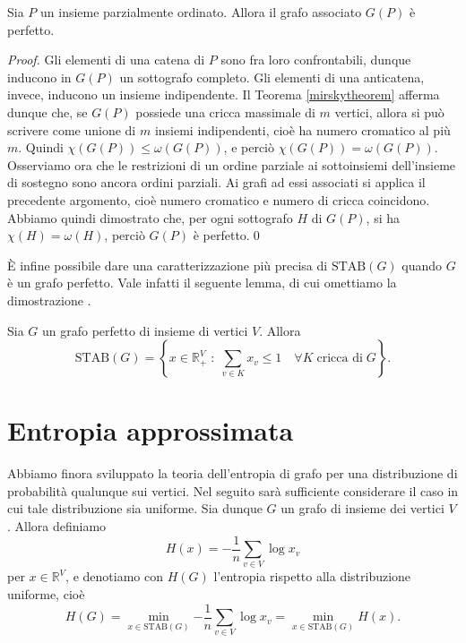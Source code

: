 \begin{corollary}
  Sia \(P\) un insieme parzialmente ordinato. Allora il grafo associato \(G(P)\) è perfetto.
\end{corollary}
\begin{proof}
  Gli elementi di una catena di \(P\) sono fra loro confrontabili, dunque inducono in \(G(P)\) un sottografo completo. Gli elementi di una anticatena, invece, inducono un insieme indipendente. Il Teorema \ref{mirskytheorem} afferma dunque che, se \(G(P)\) possiede una cricca massimale di \(m\) vertici, allora si pu\`o scrivere come unione di \(m\) insiemi indipendenti, cio\`e ha numero cromatico al più \(m\). Quindi \(\chi(G(P))\le \omega(G(P))\), e perciò \(\chi(G(P))=\omega(G(P))\). Osserviamo ora che le restrizioni di un ordine parziale ai sottoinsiemi dell'insieme di sostegno sono ancora ordini parziali. Ai grafi ad essi associati si applica il precedente argomento, cioè numero cromatico e numero di cricca coincidono. Abbiamo quindi dimostrato che, per ogni sottografo \(H\) di \(G(P)\), si ha \(\chi(H)=\omega(H)\), perciò \(G(P)\) è perfetto.\qed
\end{proof}

È infine possibile dare una caratterizzazione più precisa di \(\text{STAB}(G)\) quando \(G\) è un grafo perfetto. Vale infatti il seguente lemma, di cui omettiamo la dimostrazione \cite{Chvatal1975}.

\begin{lemma}
	[Chvatál] \label{chvatallemma} Sia \(G\) un grafo perfetto di insieme di vertici \(V\). Allora
	\[
	  \text{STAB}(G) = \left\{x\in \mathbb{R}_{+}^V\;:\;\sum_{v\in K}{x_v}\le 1\quad \forall K\;\text{cricca di}\;G\right\}\text{.}
	\]
\end{lemma}

\section{Entropia approssimata}

Abbiamo finora sviluppato la teoria dell'entropia di grafo per una distribuzione di probabilità qualunque sui vertici. Nel seguito sarà sufficiente considerare il caso in cui tale distribuzione sia uniforme. Sia dunque \(G\) un grafo di insieme dei vertici \(V\). Allora definiamo
\[
  H(x) = -\frac{1}{n}\sum_{v\in V}{\log{x_v}}
\]
per \(x\in\mathbb{R}^V\), e denotiamo con \(H(G)\) l'entropia rispetto alla distribuzione uniforme, cioè
\[
  H(G) = \min_{x\in \text{STAB}(G)}{-\frac{1}{n}\sum_{v\in V}{\log{x_v}}} = \min_{x\in \text{STAB}(G)}{H(x)}\text{.}
\]

